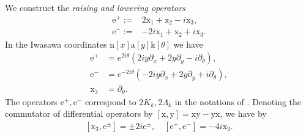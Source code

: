 \documentclass[12pt]{amsart}
\theoremstyle{definition}
\theoremstyle{remark}
\numberwithin{equation}{section}
\newcommand{\1}{{\mathbf 1}}
\begin{document}
We construct the \emph{raising and lowering operators}
\begin{align*}
    \mathrm{e}^+ :=& 2 \mathrm{x}_1 + \mathrm{x}_2-i\mathrm{x}_3, \\
      \mathrm{e}^- :=& -2i \mathrm{x}_1 + \mathrm{x}_2+i\mathrm{x}_3.
\end{align*}
In the Iwasawa coordinates  $ \mathrm{n}[x] \mathrm{a}[y] \mathrm{k}[\theta]$ we have
\begin{align*}
\mathrm{e}^+  &= e^{2i\theta} (2iy\partial_x + 2 y \partial_y-i\partial_\theta),\\
\mathrm{e}^- &= e^{-2i\theta}(-2iy\partial_x + 2 y \partial_y+i\partial_\theta),\\
\mathrm{x}_3 &= \partial_\theta.
\end{align*}
The operators $\mathrm{e}^+,\mathrm{e}^-$ correspond to $2 K_k, 2 \Lambda_k$ in the notations of \cite[Section 4]{DFIartin}. Denoting the commutator of differential operators by $[\mathrm{x},\mathrm{y}] = \mathrm{x} \mathrm{y} - \mathrm{y} \mathrm{x}$, we have by \cite[(7.2)]{motohashi}
\begin{align}\label{eq:diffopcommutator}
[\mathrm{x}_3, \mathrm{e}^{\pm}] =  \pm 2i \mathrm{e}^{\pm}, \quad [\mathrm{e}^+, \mathrm{e}^-] = -4i \mathrm{x}_3.
\end{align}
\end{document}

